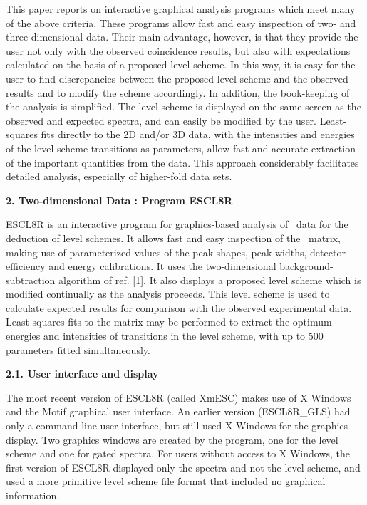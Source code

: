 This paper reports on interactive graphical analysis programs which meet many
of the above criteria. These programs allow fast and easy inspection of two-
and three-dimensional data. Their main advantage, however, is that they provide
the user not only with the observed coincidence results, but also with
expectations calculated on the basis of a proposed level scheme. In this way,
it is easy for the user to find discrepancies between the proposed level scheme
and the observed results and to modify the scheme accordingly. In addition, the
book-keeping of the analysis is simplified. The level scheme is displayed on
the same screen as the observed and expected spectra, and can easily be
modified by the user. Least-squares fits directly to the 2D and/or 3D data,
with the intensities and energies of the level scheme transitions as
parameters, allow fast and accurate extraction of the important quantities
from the data. This approach considerably facilitates detailed analysis,
especially of higher-fold data sets.

\begin{center}
{\bf               2. Two-dimensional Data : Program ESCL8R}
\end{center}

ESCL8R is an interactive program for graphics-based analysis of \ghg\ data for
the deduction of level schemes. It allows fast and easy inspection of the \ghg\
matrix, making use of parameterized values of the peak shapes, peak widths,
detector efficiency and energy calibrations. It uses the two-dimensional
background-subtraction algorithm of ref. [1]. It also displays a proposed level
scheme which is modified continually as the analysis proceeds. This level
scheme is used to calculate expected results for comparison with the observed
experimental data. Least-squares fits to the matrix may be performed to extract
the optimum energies and intensities of transitions in the level scheme, with
up to 500 parameters fitted simultaneously.

\noindent
{\bf 2.1. User interface and display}

The most recent version of ESCL8R (called XmESC) makes use of X Windows and the
Motif graphical user interface. An earlier version (ESCL8R\_GLS) had only a
command-line user interface, but still used X Windows for the graphics display.
Two graphics windows are created by the program, one for the level scheme and
one for gated spectra. For users without access to X Windows, the first version
of ESCL8R displayed only the spectra and not the level scheme, and used a more
primitive level scheme file format that included no graphical information.


